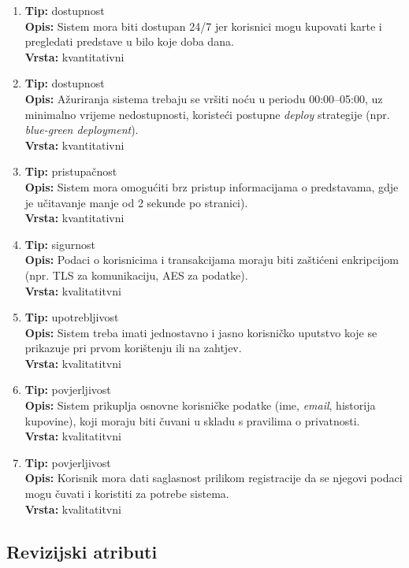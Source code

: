 \begin{enumerate}
    \item\textbf{Tip:} dostupnost\\
    \textbf{Opis:} Sistem mora biti dostupan 24/7 jer korisnici mogu kupovati karte i pregledati predstave u bilo koje doba dana.\\
    \textbf{Vrsta:} kvantitativni
    \item\textbf{Tip:} dostupnost\\
    \textbf{Opis:} Ažuriranja sistema trebaju se vršiti noću u periodu 00:00–05:00, uz minimalno vrijeme nedostupnosti, koristeći postupne \textit{deploy} strategije (npr. \textit{blue-green deployment}).\\
    \textbf{Vrsta:} kvantitativni
    \item\textbf{Tip:} pristupačnost\\
    \textbf{Opis:} Sistem mora omogućiti brz pristup informacijama o predstavama, gdje je učitavanje manje od 2 sekunde po stranici).\\
    \textbf{Vrsta:} kvantitativni
    \item\textbf{Tip:} sigurnost\\
    \textbf{Opis:} Podaci o korisnicima i transakcijama moraju biti zaštićeni enkripcijom (npr. TLS za komunikaciju, AES za podatke).\\
    \textbf{Vrsta:} kvalitatitvni
    \item\textbf{Tip:} upotrebljivost\\
    \textbf{Opis:} Sistem treba imati jednostavno i jasno korisničko uputstvo koje se prikazuje pri prvom korištenju ili na zahtjev.\\
    \textbf{Vrsta:} kvalitatitvni
    \item\textbf{Tip:} povjerljivost\\
    \textbf{Opis:} Sistem prikuplja osnovne korisničke podatke (ime, \textit{email}, historija kupovine), koji moraju biti čuvani u skladu s pravilima o privatnosti.\\
    \textbf{Vrsta:} kvalitatitvni
    \item\textbf{Tip:} povjerljivost\\
    \textbf{Opis:} Korisnik mora dati saglasnost prilikom registracije da se njegovi podaci mogu čuvati i koristiti za potrebe sistema.\\
    \textbf{Vrsta:} kvalitatitvni
\end{enumerate}

\sloppy
\subsection{Revizijski atributi}

